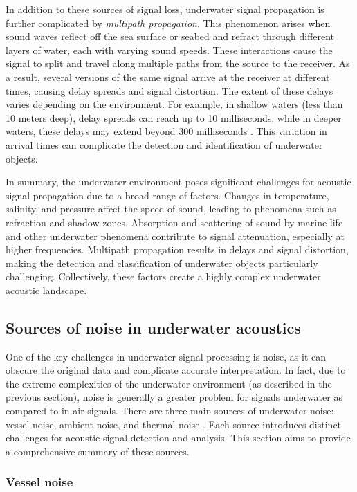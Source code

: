 In addition to these sources of signal loss, underwater signal propagation is further complicated by \textit{multipath propagation}. This phenomenon arises when sound waves reflect off the sea surface or seabed and refract through different layers of water, each with varying sound speeds. These interactions cause the signal to split and travel along multiple paths from the source to the receiver. As a result, several versions of the same signal arrive at the receiver at different times, causing delay spreads and signal distortion. The extent of these delays varies depending on the environment. For example, in shallow waters (less than 10 meters deep), delay spreads can reach up to 10 milliseconds, while in deeper waters, these delays may extend beyond 300 milliseconds \cite{vaccaro_past_1998}. This variation in arrival times can complicate the detection and identification of underwater objects.

In summary, the underwater environment poses significant challenges for acoustic signal propagation due to a broad range of factors. Changes in temperature, salinity, and pressure affect the speed of sound, leading to phenomena such as refraction and shadow zones. Absorption and scattering of sound by marine life and other underwater phenomena contribute to signal attenuation, especially at higher frequencies. Multipath propagation results in delays and signal distortion, making the detection and classification of underwater objects particularly challenging. Collectively, these factors create a highly complex underwater acoustic landscape.

\subsection{Sources of noise in underwater acoustics}\label{subsec:noise}

One of the key challenges in underwater signal processing is noise, as it can obscure the original data and complicate accurate interpretation. In fact, due to the extreme complexities of the underwater environment (as described in the previous section), noise is generally a greater problem for signals underwater as compared to in-air signals. There are three main sources of underwater noise: vessel noise, ambient noise, and thermal noise \cite{waite_sonar_2002}. Each source introduces distinct challenges for acoustic signal detection and analysis. This section aims to provide a comprehensive summary of these sources.

\subsubsection{Vessel noise}

